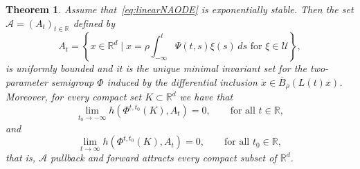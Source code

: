 \documentclass[10pt,a4paper]{amsart}
\newtheorem{thm}{Theorem}
\newcommand{\A}{\mathcal{A}}
\newcommand{\R}{\mathbb{R}}
\newcommand{\U}{\mathcal{U}}
\newcommand\note[1]{\marginpar{\flushleft\sffamily\tiny #1}}
\begin{document}
\begin{thm}\label{thm:exist-attractor}
    Assume that~\eqref{eq:linearNAODE} is exponentially stable. Then the set $\A=( A_t)_{t\in\R}$ defined by    \begin{equation}\label{eq:hyp_sols_lin}
         A_t=\left\{x\in\R^d\mid x=\rho\int_{-\infty}^t\Psi(t,s)\xi(s)\,ds\text{ for }\xi\in\U\right\},
    \end{equation}
    is uniformly bounded and it is the unique minimal invariant set for the two-parameter semigroup $\Phi$ induced by the differential inclusion $\dot x\in \overline B_\rho(L(t)x)$. Moreover, for every compact set $ K\subset\R^d$ we have that 
    \[
    \lim_{t_0\to-\infty} h(\Phi^{t,t_0}(K), A_t)=0,\qquad \text{for all } t\in\R, 
    \]
    and 
    \[
    \lim_{t\to\infty} h(\Phi^{t,t_0}(K), A_t)=0,\qquad \text{for all } t_0\in\R, 
    \]
    that is, $ \A$ pullback and forward attracts every compact subset of $\R^d$.
\end{thm}
\end{document}
